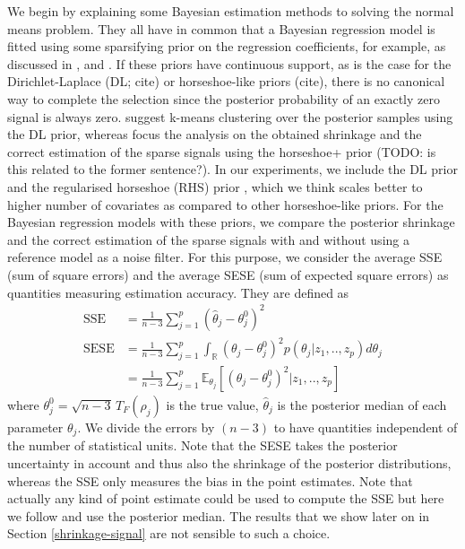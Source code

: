\documentclass[american,]{article}
\theoremstyle{definition}
\begin{document}
We begin by explaining some Bayesian estimation methods to solving the normal means problem. They all have in common that a Bayesian regression model is fitted using some sparsifying prior on the regression coefficients, for example, as discussed in \cite{paper:dirichlet_laplace}, \cite{bhadra2017horseshoe+} and \cite{johnstone2004needles}. If these priors have continuous support, as is the case for the Dirichlet-Laplace (DL; cite) or horseshoe-like priors (cite), there is no canonical way to complete the selection since the posterior probability of an exactly zero signal is always zero. \cite{paper:dirichlet_laplace} suggest k-means clustering over the posterior samples using the DL prior, whereas \cite{bhadra2017horseshoe+} focus the analysis on the obtained shrinkage and the correct estimation of the sparse signals using the horseshoe+ prior (TODO: is this related to the former sentence?). In our experiments, we include the DL prior and the regularised horseshoe (RHS) prior \citep{paper:rhs}, which we think scales better to higher number of covariates as compared to other horseshoe-like priors. For the Bayesian regression models with these priors, we compare the posterior shrinkage and the correct estimation of the sparse signals with and without using a reference model as a noise filter. For this purpose, we consider the   average SSE (sum of square errors) and the average SESE (sum of expected square errors) as quantities measuring estimation accuracy. They are defined as
\
\begin{align}
\text{SSE}&=\frac{1}{n-3}\sum_{j=1}^{p}(\hat{\theta}_{j} - \theta^{0}_{j})^{2} \label{eq:SSE} \\
\text{SESE}&=\frac{1}{n-3}\sum_{j=1}^{p}\int_{\mathbb{R}}(\theta_{j}-\theta^{0}_{j})^{2}p(\theta_{j}|z_{1},..,z_{p})d\theta_{j} \\
&=\frac{1}{n-3}\sum_{j=1}^{p}\mathbb{E}_{\theta_{j}}[(\theta_{j}-\theta^{0}_{j})^{2}|z_{1},..,z_{p}] \label{eq:SESE}
\end{align}
where $\theta_{j}^{0}=\sqrt{n-3}\,T_{F}(\rho_{j})$ is the true value, $\hat{\theta}_{j}$ is the posterior median of each parameter $\theta_{j}$. We divide the errors by $(n-3)$ to have quantities independent of the number of statistical units. Note that the SESE takes the posterior uncertainty in account and thus also the shrinkage of the posterior distributions, whereas the SSE only measures the bias in the point estimates. Note that actually any kind of point estimate could be used to compute the SSE but here we follow \cite{paper:dirichlet_laplace} and use the posterior median. The results that we show later on in Section \ref{shrinkage-signal} are not sensible to such a choice. 
\end{document}

